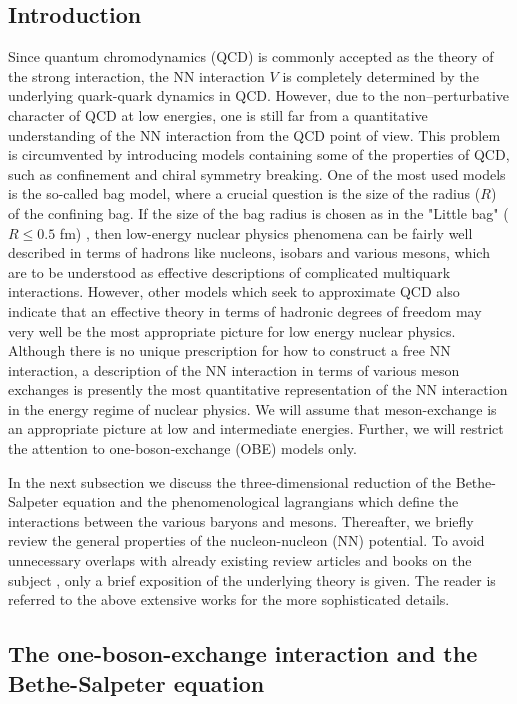 
\subsection{Introduction}

Since quantum chromodynamics (QCD) is commonly
accepted as the theory of the strong interaction, the
NN interaction $V$ is completely determined by the underlying
quark-quark dynamics in QCD. However, due to the non--perturbative
character of QCD at low energies, one is still far from a
quantitative understanding of the NN interaction from the QCD point of
view. This problem is circumvented by introducing
models containing some of the properties of QCD, such as
confinement and chiral symmetry breaking. One of the most used models
is the so-called bag model, where a crucial question is the
size of the radius ($R$) of the confining bag. If the size of the bag radius
is chosen as in the "Little bag" ($R\leq 0.5$ fm) \cite{br79}, then
low-energy nuclear physics phenomena can be fairly well described
in terms of hadrons like nucleons, isobars and various mesons,
which are to be understood as effective descriptions of complicated
multiquark interactions.
However, other models which
seek to approximate QCD also indicate that an effective theory in terms
of hadronic degrees of freedom may very well be the most appropriate
picture for low energy nuclear physics.
Although there is no unique prescription for how to construct
a free NN interaction, a description
of the NN interaction in terms of various meson exchanges is presently
the most quantitative representation of the NN interaction
\cite{mac89,mes79}
in the energy regime of nuclear physics.
We will assume that meson-exchange is an appropriate picture at low
and intermediate energies. Further, we will restrict the attention
to one-boson-exchange (OBE) models only.

In the next subsection we discuss the three-dimensional
reduction of the Bethe-Salpeter equation and
the phenomenological lagrangians
which define the interactions between the various baryons and mesons.
Thereafter, we briefly review the general properties of the nucleon-nucleon
(NN) potential.
To avoid unnecessary overlaps with already existing review articles and
books
on the subject \cite{mhe87,mac89,erk74,bj76}, only a brief
exposition of the underlying theory is given. The reader is referred
to the above extensive works for the more sophisticated details.


\subsection{The one-boson-exchange interaction and the Bethe-Salpeter
equation}

